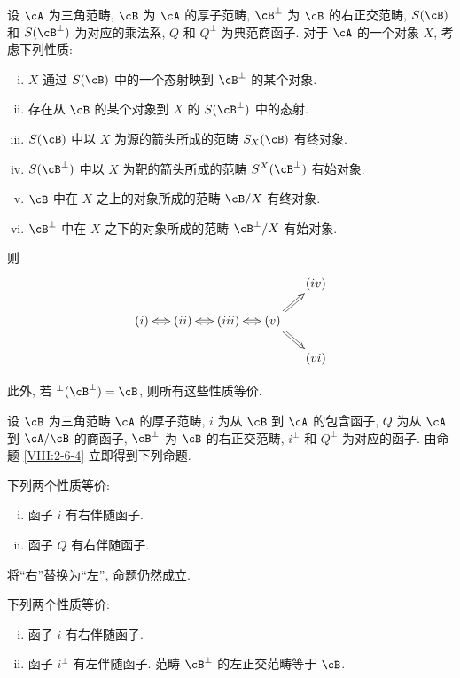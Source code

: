 \begin{proposition}\label{VIII:2-6-4}
设 $\cA$ 为三角范畴, $\cB$ 为 $\cA$ 的厚子范畴, $\cB^\bot$ 为 $\cB$ 的右正交范畴, $S(\cB)$ 和 $S(\cB^\bot)$ 为对应的乘法系, $Q$ 和 $Q^\bot$ 为典范商函子. 对于 $\cA$ 的一个对象 $X$, 考虑下列性质:
\begin{enumerate}[(i)]
  \item $X$ 通过 $S(\cB)$ 中的一个态射映到 $\cB^\bot$ 的某个对象.
  \item 存在从 $\cB$ 的某个对象到 $X$ 的 $S(\cB^\bot)$ 中的态射.
  \item $S(\cB)$ 中以 $X$ 为源的箭头所成的范畴 $S_X(\cB)$ 有终对象.
  \item $S(\cB^\bot)$ 中以 $X$ 为靶的箭头所成的范畴 $S^X(\cB^\bot)$ 有始对象.
  \item $\cB$ 中在 $X$ 之上的对象所成的范畴 $\cB/X$ 有终对象.
  \item $\cB^\bot$ 中在 $X$ 之下的对象所成的范畴 $\cB^\bot/X$ 有始对象.
\end{enumerate}
则
\[\xymatrix@=0.5cm{
  & & & & (iv) \\
  (i) \ar@{<=>}[r]
    & (ii) \ar@{<=>}[r]
    & (iii) \ar@{<=>}[r]
    & (v) \ar@{=>}[ur] \ar@{=>}[dr] \\
  & & & & (vi)
}\]

此外, 若 $^\bot(\cB^\bot)=\cB$, 则所有这些性质等价.
\end{proposition}

设 $\cB$ 为三角范畴 $\cA$ 的厚子范畴, $i$ 为从 $\cB$ 到 $\cA$ 的包含函子, $Q$ 为从 $\cA$ 到 $\cA/\cB$ 的商函子, $\cB^\bot$ 为 $\cB$ 的右正交范畴, $i^\bot$ 和 $Q^\bot$ 为对应的函子. 由命题 \ref{VIII:2-6-4} 立即得到下列命题.

\begin{proposition}\label{VIII:2-6-5}
下列两个性质等价:
\begin{enumerate}[(i)]
  \item 函子 $i$ 有右伴随函子.
  \item 函子 $Q$ 有右伴随函子.
\end{enumerate}
\end{proposition}

将“右”替换为“左”, 命题仍然成立.

\begin{proposition}\label{VIII:2-6-6}
下列两个性质等价:
\begin{enumerate}[(i)]
  \item 函子 $i$ 有右伴随函子.
  \item 函子 $i^\bot$ 有左伴随函子. 范畴 $\cB^\bot$ 的左正交范畴等于 $\cB$.
\end{enumerate}
\end{proposition}

